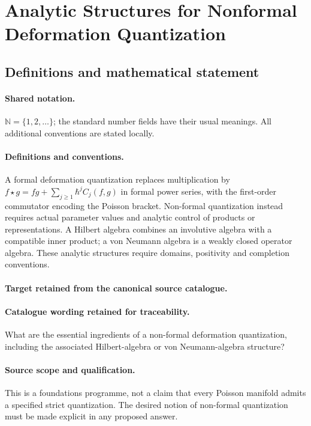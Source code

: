 \documentclass[11pt]{article}
\begin{document}
\section{Analytic Structures for Nonformal Deformation Quantization}\label{statement}

\subsection{Definitions and mathematical statement}

\paragraph{Shared notation.}$\mathbb N=\{1,2,\ldots\}$; the standard number fields have their usual meanings. All additional conventions are stated locally.


\paragraph{Definitions and conventions.}
A formal deformation quantization replaces multiplication by $f\star g=fg+\sum_{j\geq1}\hbar^j C_j(f,g)$ in formal power series, with the first-order commutator encoding the Poisson bracket. Non-formal quantization instead requires actual parameter values and analytic control of products or representations. A Hilbert algebra combines an involutive algebra with a compatible inner product; a von Neumann algebra is a weakly closed operator algebra. These analytic structures require domains, positivity and completion conventions.

\paragraph{Target retained from the canonical source catalogue.}
\paragraph{Catalogue wording retained for traceability.}
What are the essential ingredients of a non-formal deformation quantization, including the associated Hilbert-algebra or von Neumann-algebra structure?

\paragraph{Source scope and qualification.}
This is a foundations programme, not a claim that every Poisson manifold admits a specified strict quantization. The desired notion of non-formal quantization must be made explicit in any proposed answer.
\end{document}
